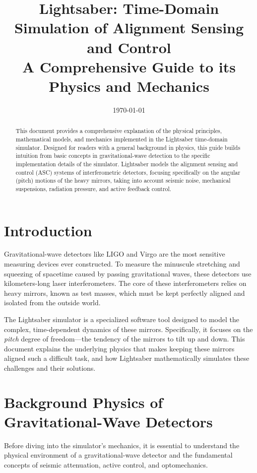 \documentclass{article}
\title{Lightsaber: Time-Domain Simulation of Alignment Sensing and Control \\ \large A Comprehensive Guide to its Physics and Mechanics}
\author{}
\date{\today}
\begin{document}
\maketitle

\begin{abstract}
This document provides a comprehensive explanation of the physical principles, mathematical models, and mechanics implemented in the Lightsaber time-domain simulator. Designed for readers with a general background in physics, this guide builds intuition from basic concepts in gravitational-wave detection to the specific implementation details of the simulator. Lightsaber models the alignment sensing and control (ASC) systems of interferometric detectors, focusing specifically on the angular (pitch) motions of the heavy mirrors, taking into account seismic noise, mechanical suspensions, radiation pressure, and active feedback control.
\end{abstract}

\tableofcontents
\newpage

\section{Introduction}
Gravitational-wave detectors like LIGO and Virgo are the most sensitive measuring devices ever constructed. To measure the minuscule stretching and squeezing of spacetime caused by passing gravitational waves, these detectors use kilometers-long laser interferometers. The core of these interferometers relies on heavy mirrors, known as test masses, which must be kept perfectly aligned and isolated from the outside world.

The Lightsaber simulator is a specialized software tool designed to model the complex, time-dependent dynamics of these mirrors. Specifically, it focuses on the \textit{pitch} degree of freedom---the tendency of the mirrors to tilt up and down. This document explains the underlying physics that makes keeping these mirrors aligned such a difficult task, and how Lightsaber mathematically simulates these challenges and their solutions.

\section{Background Physics of Gravitational-Wave Detectors}
Before diving into the simulator's mechanics, it is essential to understand the physical environment of a gravitational-wave detector and the fundamental concepts of seismic attenuation, active control, and optomechanics.
\end{document}
